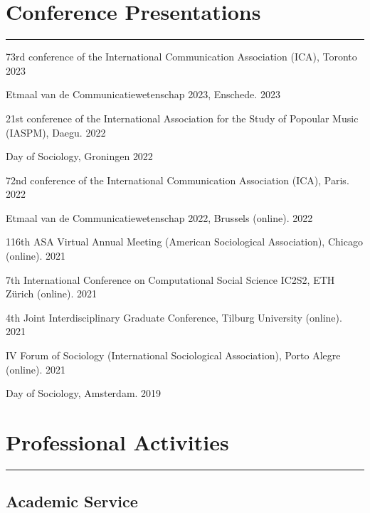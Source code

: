 \documentclass[12pt,]{article}
\begin{document}
\hypertarget{conference-presentations}{%
\section{Conference Presentations}\label{conference-presentations}}

\vspace{-10pt}
\rule{1\linewidth}{\linethickness}

73rd conference of the International Communication Association (ICA),
Toronto \hfill \begingroup\small 2023\endgroup

Etmaal van de Communicatiewetenschap 2023, Enschede.
\hfill \begingroup\small 2023\endgroup

21st conference of the International Association for the Study of
Popoular Music (IASPM), Daegu. \hfill \begingroup\small 2022\endgroup

Day of Sociology, Groningen \hfill \begingroup\small 2022\endgroup

72nd conference of the International Communication Association (ICA),
Paris. \hfill \begingroup\small 2022\endgroup

Etmaal van de Communicatiewetenschap 2022, Brussels (online).
\hfill \begingroup\small 2022\endgroup

116th ASA Virtual Annual Meeting (American Sociological Association),
Chicago (online). \hfill \begingroup\small 2021\endgroup

7th International Conference on Computational Social Science IC2S2, ETH
Zürich (online). \hfill \begingroup\small 2021\endgroup

4th Joint Interdisciplinary Graduate Conference, Tilburg University
(online). \hfill \begingroup\small 2021\endgroup

IV Forum of Sociology (International Sociological Association), Porto
Alegre (online). \hfill \begingroup\small 2021\endgroup

Day of Sociology, Amsterdam. \hfill \begingroup\small 2019\endgroup

\hypertarget{professional-activities}{%
\section{Professional Activities}\label{professional-activities}}

\vspace{-10pt}
\rule{1\linewidth}{\linethickness}

\hypertarget{academic-service}{%
\subsection{Academic Service}\label{academic-service}}
\end{document}
